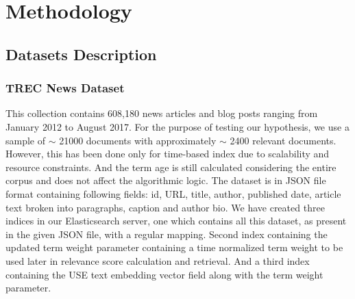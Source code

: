 \chapter{Methodology}
\section{Datasets Description}
\subsection{TREC News Dataset}
\cite{RN19} This collection contains 608,180 news articles and blog posts ranging from January 2012 to August 2017. For the purpose of testing our hypothesis, we use a sample of $\mathtt{\sim}$ 21000 documents with approximately $\mathtt{\sim}$ 2400 relevant documents. However, this has been done only for time-based index due to scalability and resource constraints. And the term age is still calculated considering the entire corpus and does not affect the algorithmic logic. The dataset is in JSON file format containing following fields: id, URL, title, author, published date, article text broken into paragraphs, caption and author bio. We have created three indices in our Elasticsearch server, one which contains all this dataset, as present in the given JSON file, with a regular mapping. Second index containing the updated term weight parameter containing a time normalized term weight to be used later in relevance score calculation and retrieval. And a third index containing the USE text embedding vector field along with the term weight parameter.

